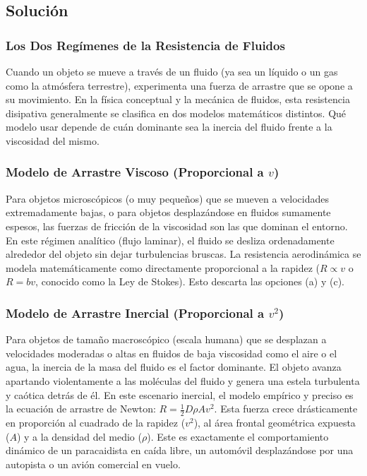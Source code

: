 \documentclass[12pt]{article}
\begin{document}
\subsection*{Solución}

\subsubsection*{Los Dos Regímenes de la Resistencia de Fluidos}
Cuando un objeto se mueve a través de un fluido (ya sea un líquido o un gas como la atmósfera terrestre), experimenta una fuerza de arrastre que se opone a su movimiento. En la física conceptual y la mecánica de fluidos, esta resistencia disipativa generalmente se clasifica en dos modelos matemáticos distintos. Qué modelo usar depende de cuán dominante sea la inercia del fluido frente a la viscosidad del mismo.

\subsubsection*{Modelo de Arrastre Viscoso (Proporcional a $v$)}
Para objetos microscópicos (o muy pequeños) que se mueven a velocidades extremadamente bajas, o para objetos desplazándose en fluidos sumamente espesos, las fuerzas de fricción de la viscosidad son las que dominan el entorno. En este régimen analítico (flujo laminar), el fluido se desliza ordenadamente alrededor del objeto sin dejar turbulencias bruscas. 
La resistencia aerodinámica se modela matemáticamente como directamente proporcional a la rapidez ($R \propto v$ o $R = bv$, conocido como la Ley de Stokes). Esto descarta las opciones (a) y (c).

\subsubsection*{Modelo de Arrastre Inercial (Proporcional a $v^2$)}
Para objetos de tamaño macroscópico (escala humana) que se desplazan a velocidades moderadas o altas en fluidos de baja viscosidad como el aire o el agua, la inercia de la masa del fluido es el factor dominante. El objeto avanza apartando violentamente a las moléculas del fluido y genera una estela turbulenta y caótica detrás de él. 
En este escenario inercial, el modelo empírico y preciso es la ecuación de arrastre de Newton: $R = \frac{1}{2}D\rho A v^2$. Esta fuerza crece drásticamente en proporción al cuadrado de la rapidez ($v^2$), al área frontal geométrica expuesta ($A$) y a la densidad del medio ($\rho$). Este es exactamente el comportamiento dinámico de un paracaidista en caída libre, un automóvil desplazándose por una autopista o un avión comercial en vuelo.
\end{document}
